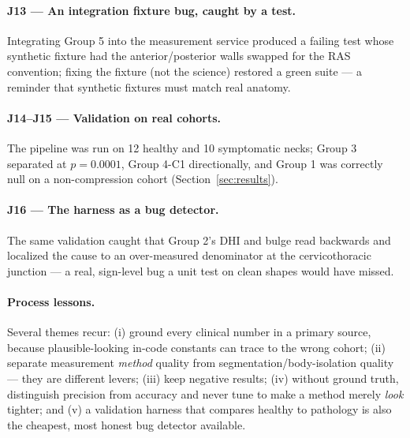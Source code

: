 \paragraph{J13 --- An integration fixture bug, caught by a test.} Integrating Group 5 into the
measurement service produced a failing test whose synthetic fixture had the anterior/posterior walls
swapped for the RAS convention; fixing the fixture (not the science) restored a green suite --- a reminder
that synthetic fixtures must match real anatomy.

\paragraph{J14--J15 --- Validation on real cohorts.} The pipeline was run on 12 healthy and 10
symptomatic necks; Group 3 separated at $p=0.0001$, Group 4-C1 directionally, and Group 1 was correctly
null on a non-compression cohort (Section~\ref{sec:results}).

\paragraph{J16 --- The harness as a bug detector.} The same validation caught that Group 2's DHI and bulge
read backwards and localized the cause to an over-measured denominator at the cervicothoracic junction ---
a real, sign-level bug a unit test on clean shapes would have missed.

\paragraph{Process lessons.} Several themes recur: (i) ground every clinical number in a primary source,
because plausible-looking in-code constants can trace to the wrong cohort; (ii) separate measurement
\emph{method} quality from segmentation/body-isolation quality --- they are different levers; (iii) keep
negative results; (iv) without ground truth, distinguish precision from accuracy and never tune to make a
method merely \emph{look} tighter; and (v) a validation harness that compares healthy to pathology is also
the cheapest, most honest bug detector available.
